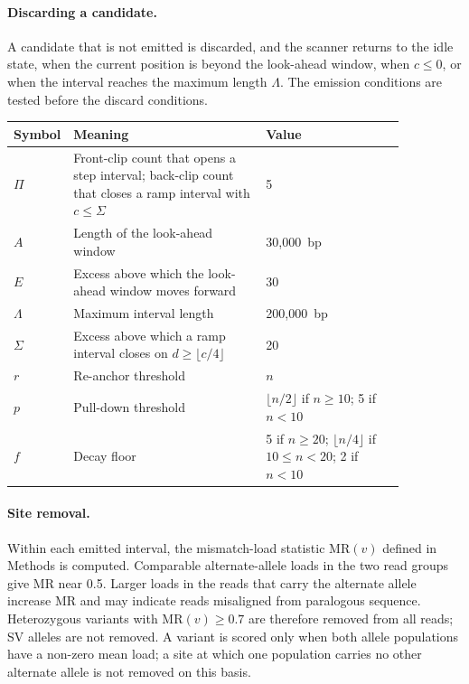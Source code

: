 \documentclass[11pt,a4paper]{article}
\begin{document}
\paragraph{Discarding a candidate.} A candidate that is not emitted is discarded, and the scanner returns to the idle state, when the current position is beyond the look-ahead window, when $c \le 0$, or when the interval reaches the maximum length $\Lambda$. The emission conditions are tested before the discard conditions.

\begin{center}
\small
\renewcommand{\arraystretch}{1.25}
\begin{tabular}{@{}l p{0.50\linewidth} p{0.36\linewidth}@{}}
\toprule
\textbf{Symbol} & \textbf{Meaning} & \textbf{Value} \\
\midrule
$\Pi$ & Front-clip count that opens a step interval; back-clip count that closes a ramp interval with $c \le \Sigma$ & 5 \\
$A$ & Length of the look-ahead window & 30{,}000~bp \\
$E$ & Excess above which the look-ahead window moves forward & 30 \\
$\Lambda$ & Maximum interval length & 200{,}000~bp \\
$\Sigma$ & Excess above which a ramp interval closes on $d \ge \lfloor c/4 \rfloor$ & 20 \\
$r$ & Re-anchor threshold & $n$ \\
$p$ & Pull-down threshold & $\lfloor n/2 \rfloor$ if $n \ge 10$; 5 if $n < 10$ \\
$f$ & Decay floor & 5 if $n \ge 20$; $\lfloor n/4 \rfloor$ if $10 \le n < 20$; 2 if $n < 10$ \\
\bottomrule
\end{tabular}
\end{center}

\paragraph{Site removal.} Within each emitted interval, the mismatch-load statistic $\mathrm{MR}(v)$ defined in Methods is computed. Comparable alternate-allele loads in the two read groups give $\mathrm{MR}$ near 0.5. Larger loads in the reads that carry the alternate allele increase $\mathrm{MR}$ and may indicate reads misaligned from paralogous sequence. Heterozygous variants with $\mathrm{MR}(v) \ge 0.7$ are therefore removed from all reads; SV alleles are not removed. A variant is scored only when both allele populations have a non-zero mean load; a site at which one population carries no other alternate allele is not removed on this basis.
\end{document}
